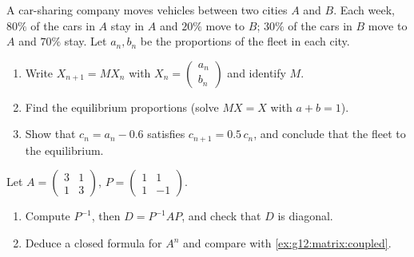 \begin{exercise}[$\star\star$]\label{exo:g12:matrix:7}
A car-sharing company moves vehicles between two cities $A$ and $B$. Each
week, $80\%$ of the cars in $A$ stay in $A$ and $20\%$ move to $B$; $30\%$
of the cars in $B$ move to $A$ and $70\%$ stay. Let $a_n, b_n$ be the
proportions of the fleet in each city.
\begin{omfigure}
\end{omfigure}
\begin{enumerate}
  \item Write $X_{n+1} = MX_n$ with
        $X_n = \begin{pmatrix} a_n\\ b_n\end{pmatrix}$ and identify $M$.
  \item Find the equilibrium proportions (solve $MX = X$ with
        $a + b = 1$).
  \item Show that $c_n = a_n - 0.6$ satisfies $c_{n+1} = 0.5\,c_n$, and
        conclude that the fleet   to the equilibrium.
\end{enumerate}
\end{exercise}

\begin{exercise}[$\star\star\star$]\label{exo:g12:matrix:8}
Let $A = \begin{pmatrix} 3 & 1\\ 1 & 3 \end{pmatrix}$,
$P = \begin{pmatrix} 1 & 1\\ 1 & -1 \end{pmatrix}$.
\begin{enumerate}
  \item Compute $P^{-1}$, then $D = P^{-1}AP$, and check that $D$ is
        diagonal.
  \item Deduce a closed formula for $A^n$ and compare with
        \cref{ex:g12:matrix:coupled}.
\end{enumerate}
\end{exercise}

